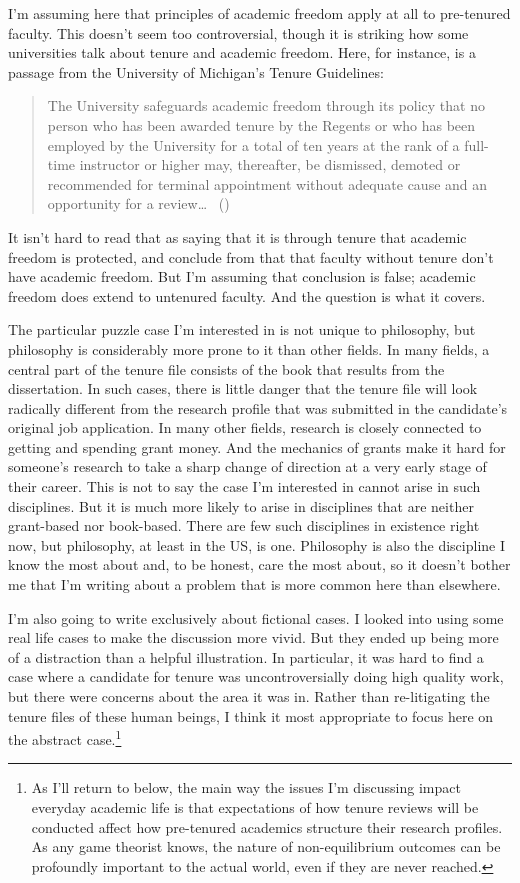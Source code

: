 \documentclass[
  11pt,
  letterpaper,
  DIV=11,
  numbers=noendperiod]{scrartcl}
\begin{document}
I'm assuming here that principles of academic freedom apply at all to
pre-tenured faculty. This doesn't seem too controversial, though it is
striking how some universities talk about tenure and academic freedom.
Here, for instance, is a passage from the University of Michigan's
Tenure Guidelines:

\begin{quote}
The University safeguards academic freedom through its policy that no
person who has been awarded tenure by the Regents or who has been
employed by the University for a total of ten years at the rank of a
full-time instructor or higher may, thereafter, be dismissed, demoted or
recommended for terminal appointment without adequate cause and an
opportunity for a review\ldots{} ~()
\end{quote}

It isn't hard to read that as saying that it is through tenure that
academic freedom is protected, and conclude from that that faculty
without tenure don't have academic freedom. But I'm assuming that
conclusion is false; academic freedom does extend to untenured faculty.
And the question is what it covers.

The particular puzzle case I'm interested in is not unique to
philosophy, but philosophy is considerably more prone to it than other
fields. In many fields, a central part of the tenure file consists of
the book that results from the dissertation. In such cases, there is
little danger that the tenure file will look radically different from
the research profile that was submitted in the candidate's original job
application. In many other fields, research is closely connected to
getting and spending grant money. And the mechanics of grants make it
hard for someone's research to take a sharp change of direction at a
very early stage of their career. This is not to say the case I'm
interested in cannot arise in such disciplines. But it is much more
likely to arise in disciplines that are neither grant-based nor
book-based. There are few such disciplines in existence right now, but
philosophy, at least in the US, is one. Philosophy is also the
discipline I know the most about and, to be honest, care the most about,
so it doesn't bother me that I'm writing about a problem that is more
common here than elsewhere.

I'm also going to write exclusively about fictional cases. I looked into
using some real life cases to make the discussion more vivid. But they
ended up being more of a distraction than a helpful illustration. In
particular, it was hard to find a case where a candidate for tenure was
uncontroversially doing high quality work, but there were concerns about
the area it was in. Rather than re-litigating the tenure files of these
human beings, I think it most appropriate to focus here on the abstract
case.\footnote{As I'll return to below, the main way the issues I'm
  discussing impact everyday academic life is that expectations of how
  tenure reviews will be conducted affect how pre-tenured academics
  structure their research profiles. As any game theorist knows, the
  nature of non-equilibrium outcomes can be profoundly important to the
  actual world, even if they are never reached.}
\end{document}
